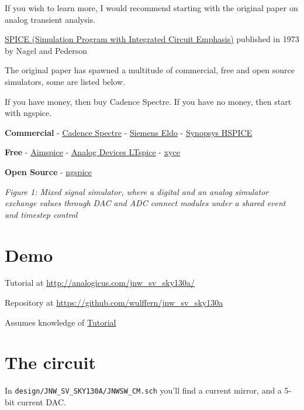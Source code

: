 If you wish to learn more, I would recommend starting with the original
paper on analog transient analysis.

\href{https://www2.eecs.berkeley.edu/Pubs/TechRpts/1973/ERL-m-382.pdf}{SPICE
(Simulation Program with Integrated Circuit Emphasis)} published in 1973
by Nagel and Pederson

The original paper has spawned a multitude of commercial, free and open
source simulators, some are listed below.

If you have money, then buy Cadence Spectre. If you have no money, then
start with ngspice.

\textbf{Commercial} -
\href{https://www.cadence.com/ko_KR/home/tools/custom-ic-analog-rf-design/circuit-simulation/spectre-simulation-platform.html}{Cadence
Spectre} - \href{https://eda.sw.siemens.com/en-US/ic/eldo/}{Siemens
Eldo} -
\href{https://www.synopsys.com/implementation-and-signoff/ams-simulation/primesim-hspice.html}{Synopsys
HSPICE}

\textbf{Free} - \href{http://aimspice.com}{Aimspice} -
\href{https://www.analog.com/en/design-center/design-tools-and-calculators/ltspice-simulator.html}{Analog
Devices LTspice} - \href{https://xyce.sandia.gov}{xyce}

\textbf{Open Source} - \href{http://ngspice.sourceforge.net}{ngspice}


{
\centering
{}
}

\emph{Figure 1: Mixed signal simulator, where a digital and an analog
simulator exchange values through DAC and ADC connect modules under a
shared event and timestep control}

\section{Demo}\label{demo}

Tutorial at \url{http://analogicus.com/jnw_sv_sky130a/}

Repository at \url{https://github.com/wulffern/jnw_sv_sky130a}

Assumes knowledge of
\href{https://analogicus.com/aic2026/sky130nm_tutorial}{Tutorial}

\section{The circuit}\label{the-circuit}

In \texttt{design/JNW\_SV\_SKY130A/JNWSW\_CM.sch} you'll find a current
mirror, and a 5-bit current DAC.

